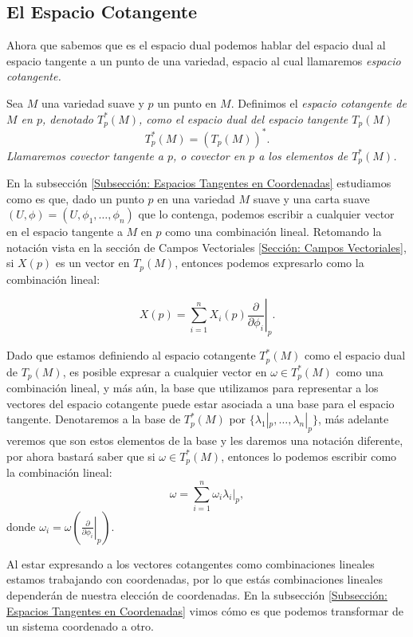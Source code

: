 \subsection{El Espacio Cotangente}\label{Subsección: El Espacio Cotangente}
Ahora que sabemos que es el espacio dual podemos hablar del espacio dual al espacio tangente a un punto de una variedad, espacio al cual llamaremos \it{espacio cotangente}.

\begin{definition}
	Sea $M$ una variedad suave y $p$ un punto en $M$. Definimos el \it{espacio cotangente de $M$ en $p$}, denotado $T_{p}^{*}(M)$, como el espacio dual del espacio tangente $T_p(M)$
	\[
		T^{*}_p(M) = (T_p(M))^*.
	\]
	Llamaremos \textit{covector tangente a $p$}, o \textit{covector en $p$} a los elementos de $T_p^{*}(M)$.
\end{definition}

En la subsección \ref{Subsección: Espacios Tangentes en Coordenadas} estudiamos como es que, dado un punto $p$ en una variedad $M$ suave y una carta suave $(U,\phi) = (U,\phi_1,\ldots,\phi_n)$ que lo contenga, podemos escribir a cualquier vector en el espacio tangente a $M$ en $p$ como una combinación lineal. Retomando la notación vista en la sección de Campos Vectoriales \ref{Sección: Campos Vectoriales}, si $X(p)$ es un vector en $T_p(M)$, entonces podemos expresarlo como la combinación lineal:

\[
	X(p) = \sum_{i=1}^{n} X_i(p) \left. \frac{\partial}{\partial \phi_i} \right|_{p}.
\]

Dado que estamos definiendo al espacio cotangente $T_{p}^{*}(M)$ como el espacio dual de $T_p(M)$, es posible expresar a cualquier vector en $\omega \in T_{p}^{*}(M)$ como una combinación lineal, y más aún, la base que utilizamos para representar a los vectores del espacio cotangente puede estar asociada a una base para el espacio tangente. Denotaremos a la base de $T_{p}^{*}(M)$ por $\{\lambda_1|_p, \ldots, \lambda_n|_p\}$, más adelante veremos que son estos elementos de la base y les daremos una notación diferente, por ahora bastará saber que si $\omega \in T_{p}^{*}(M)$, entonces lo podemos escribir como la combinación lineal:
\[
	\omega = \sum_{i=1}^{n} \omega_i \left. \lambda_i \right|_p,
\]
donde $\omega_i = \omega \left( \left. \frac{\partial}{\partial \phi_i} \right|_p\right)$.

Al estar expresando a los vectores cotangentes como combinaciones lineales estamos trabajando con coordenadas, por lo que estás combinaciones lineales dependerán de nuestra elección de coordenadas. En la subsección \ref{Subsección: Espacios Tangentes en Coordenadas} vimos cómo es que podemos transformar de un sistema coordenado a otro.

